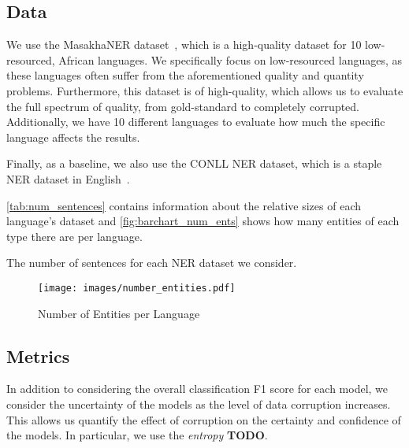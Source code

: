 \documentclass{article}
\newcommand{\mike}[1]{\textcolor{red}{#1}}
\begin{document}
\subsection{Data}
\label{sec:data}
We use the MasakhaNER dataset~\citep{adelani2021MasakhaNER}, which is a high-quality dataset for 10 low-resourced, African languages. We specifically focus on low-resourced languages, as these languages often suffer from the aforementioned quality and quantity problems. Furthermore, this dataset is of high-quality, which allows us to evaluate the full spectrum of quality, from gold-standard to completely corrupted. Additionally, we have 10 different languages to evaluate how much the specific language affects the results.

Finally, as a baseline, we also use the CONLL NER dataset, which is a staple NER dataset in English~\citep{sang2003introduction_conll}.

\autoref{tab:num_sentences} contains information about the relative sizes of each language's dataset and \autoref{fig:barchart_num_ents} shows how many entities of each type there are per language.



\begin{table}[]
    \centering
    \caption{The number of sentences for each NER dataset we consider.}
    \label{tab:num_sentences}
    \begin{adjustbox}{width=1\linewidth}
    
    \end{adjustbox}
\end{table}

\begin{figure}
    \centering
    \texttt{[image: images/number\_entities.pdf]}
    \caption{Number of Entities per Language}
    \label{fig:barchart_num_ents}
\end{figure}

\subsection{Metrics}
In addition to considering the overall classification F1 score for each model, we consider the uncertainty of the models as the level of data corruption increases. This allows us quantify the effect of corruption on the certainty and confidence of the models. In particular, we use the \textit{entropy} \textbf{TODO}.
\end{document}
